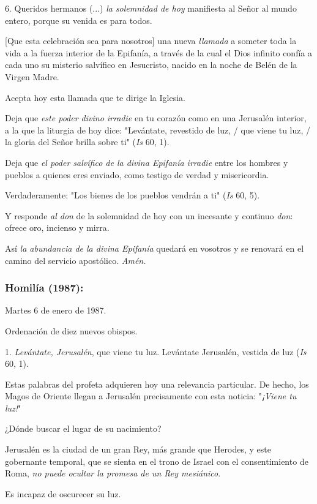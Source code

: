 \begin{body}
6. Queridos hermanos (...) \emph{la solemnidad de hoy} manifiesta al Señor al mundo entero, porque su venida es para todos.

{[}Que esta celebración sea para nosotros{]} una nueva \emph{llamada} a someter toda la vida a la fuerza interior de la Epifanía, a través de la cual el Dios infinito confía a cada uno su misterio salvífico en Jesucristo, nacido en la noche de Belén de la Virgen Madre.

Acepta hoy esta llamada que te dirige la Iglesia.

Deja que \emph{este poder divino irradie} en tu corazón como en una Jerusalén interior, a la que la liturgia de hoy dice: "Levántate, revestido de luz, / que viene tu luz, / la gloria del Señor brilla sobre ti" (\emph{Is} 60, 1).

Deja que \emph{el poder salvífico de la divina Epifanía irradie} entre los hombres y pueblos a quienes eres enviado, como testigo de verdad y misericordia.

Verdaderamente: "Los bienes de los pueblos vendrán a ti" (\emph{Is} 60, 5).

Y responde \emph{al don} de la solemnidad de hoy con un incesante y continuo \emph{don}: ofrece oro, incienso y mirra.

Así \emph{la abundancia de la divina Epifanía} quedará en vosotros y se renovará en el camino del servicio apostólico. \emph{Amén.}

\subsubsection{Homilía (1987): }

Martes 6 de enero de 1987.

Ordenación de diez nuevos obispos.

1. \emph{Levántate, Jerusalén}, que viene tu luz. Levántate Jerusalén, vestida de luz (\emph{Is} 60, 1).

Estas palabras del profeta adquieren hoy una relevancia particular. De hecho, los Magos de Oriente llegan a Jerusalén precisamente con esta noticia: "\emph{¡Viene tu luz!}"

¿Dónde buscar el lugar de su nacimiento?

Jerusalén es la ciudad de un gran Rey, más grande que Herodes, y este gobernante temporal, que se sienta en el trono de Israel con el consentimiento de Roma, \emph{no puede ocultar la promesa de un Rey mesiánico}.

Es incapaz de oscurecer su luz.


\end{body}
